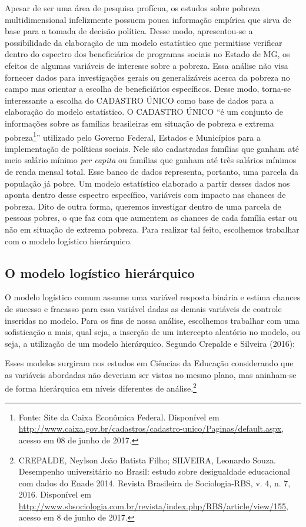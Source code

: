 \documentclass[a4paper, 12pt, openright, oneside, english, brazil, article]{abntex2}
\begin{document}
	Apesar de ser uma área de pesquisa profícua, os estudos sobre pobreza multidimensional infelizmente possuem pouca informação empírica que sirva de base para a tomada de decisão política. Desse modo, apresentou-se a possibilidade da elaboração de um modelo estatístico que permitisse verificar dentro do espectro dos beneficiários de programas sociais no Estado de MG, os efeitos de algumas variáveis de interesse sobre a pobreza. Essa análise não visa fornecer dados para investigações gerais ou generalizáveis acerca da pobreza no campo mas orientar a escolha de beneficiários específicos. Desse modo, torna-se interessante a escolha do CADASTRO ÚNICO como base de dados para a elaboração do modelo estatístico. O CADASTRO ÚNICO ``é um conjunto de informações sobre as famílias brasileiras em situação de pobreza e extrema pobreza\footnote{Fonte: Site da Caixa Econômica Federal. Disponível em \url{http://www.caixa.gov.br/cadastros/cadastro-unico/Paginas/default.aspx}, acesso em 08 de junho de 2017.}'' utilizado pelo Governo Federal, Estados e Municípios para a implementação de políticas sociais. Nele são cadastradas famílias que ganham até meio salário mínimo \textit{per capita} ou famílias que ganham até três salários mínimos de renda mensal total. Esse banco de dados representa, portanto, uma parcela da população já pobre. Um modelo estatístico elaborado a partir desses dados nos aponta dentro desse espectro específico, variáveis com impacto nas chances de pobreza. Dito de outra forma, queremos investigar dentro de uma parcela de pessoas pobres, o que faz com que aumentem as chances de cada família estar ou não em situação de extrema pobreza. Para realizar tal feito, escolhemos trabalhar com o modelo logístico hierárquico.
	
	\subsection{O modelo logístico hierárquico}
	
	O modelo logístico comum assume uma variável resposta binária e estima chances de sucesso e fracasso para essa variável dadas as demais variáveis de controle inseridas no modelo. Para os fins de nossa análise, escolhemos trabalhar com uma sofisticação a mais, qual seja, a inserção de um intercepto aleatório no modelo, ou seja, a utilização de um modelo hierárquico. Segundo Crepalde e Silveira (2016):
	
	\begin{citacao}
	Esses modelos surgiram nos estudos em Ciências da Educação considerando que as variáveis abordadas não deveriam ser vistas no mesmo plano, mas aninham-se de forma hierárquica em níveis diferentes de análise.\footnote{CREPALDE, Neylson João Batista Filho; SILVEIRA, Leonardo Souza. Desempenho universitário no Brasil: estudo sobre desigualdade educacional com dados do Enade 2014. Revista Brasileira de Sociologia-RBS, v. 4, n. 7, 2016. Disponível em \url{http://www.sbsociologia.com.br/revista/index.php/RBS/article/view/155}, acesso em 8 de junho de 2017.}		
	\end{citacao}
	
\end{document}
